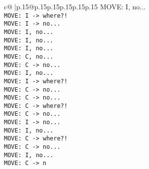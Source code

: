 \documentclass{article}
\begin{document}
{\begin{supertabular}{c@{$\;$}|p{.15\linewidth}@{}p{.15\linewidth}p{.15\linewidth}p{.15\linewidth}p{.15\linewidth}p{.15\linewidth}}
{{{ MOVE: I, no...\\ \tt  MOVE: I -> where?!\\ \tt  MOVE: I -> no...\\ \tt  MOVE: I, no...\\ \tt  MOVE: I, no...\\ \tt  MOVE: I, no...\\ \tt  MOVE: C, no...\\ \tt  MOVE: C -> no...\\ \tt  MOVE: I, no...\\ \tt  MOVE: I -> where?!\\ \tt  MOVE: C -> no...\\ \tt  MOVE: C -> no...\\ \tt  MOVE: C -> where?!\\ \tt  MOVE: C -> no...\\ \tt  MOVE: I -> no...\\ \tt  MOVE: I, no...\\ \tt  MOVE: C -> where?!\\ \tt  MOVE: C -> no...\\ \tt  MOVE: I, no...\\ \tt  MOVE: C -> n}}}
\end{supertabular}}
\end{document}

